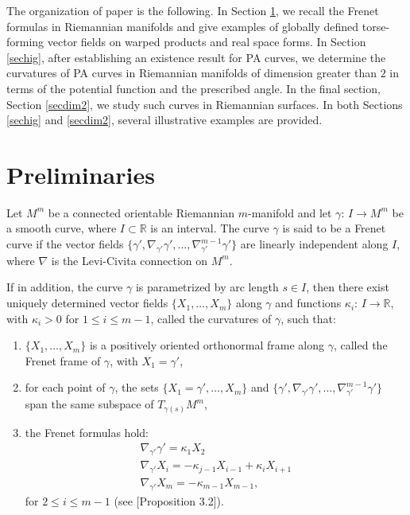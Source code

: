 \documentclass[12pt]{amsart}
\def\r{\mathbb R}
\theoremstyle{definition}
\begin{document}
The organization of paper is the following. In Section \ref{pre}, we recall the Frenet formulas in Riemannian manifolds and give examples of globally defined torse-forming vector fields on warped products and real space forms. In Section \ref{sechig}, after establishing an existence result for PA curves, we determine the curvatures of PA curves in Riemannian manifolds of dimension greater than $2$ in terms of the potential function and the prescribed angle. In the final section, Section \ref{secdim2}, we study such curves in Riemannian surfaces. In both Sections \ref{sechig} and \ref{secdim2}, several illustrative examples are provided.


\section{Preliminaries} \label{pre}

Let $M^m$ be a connected orientable Riemannian $m$-manifold and let $\gamma:\,I\to M^m$ be a smooth curve, where $I\subset \r$ is an interval.  The curve $\gamma$ is said to be a Frenet curve if the vector fields $\{\gamma',\nabla_{\gamma'}\gamma',...,\nabla_{\gamma'}^{m-1}\gamma'\}$ are linearly independent along $I$, where $\nabla$ is the Levi-Civita connection on $M^m$.

If in addition, the curve $\gamma$ is parametrized by arc length $s\in I$, then there exist uniquely determined vector fields $\{X_1,\ldots,X_m\}$ along $\gamma$ and functions $\kappa_i:\,I\to \r$, with $\kappa_i >0$ for $1\leq i \leq m-1$, called  the curvatures of $\gamma$, such that:
\begin{enumerate}
\item[(i)] $\{X_1,\ldots,X_m\}$ is a positively oriented orthonormal frame along $\gamma$, called the Frenet frame of $\gamma$, with $X_1=\gamma'$,

\item[(ii)] for each point of $\gamma$, the sets $\{X_1=\gamma',\ldots,X_m\}$ and $\{\gamma',\nabla_{\gamma'}\gamma',...,\nabla_{\gamma'}^{m-1}\gamma'\}$ 
span the same subspace of $T_{\gamma(s)}M^m$,

\item[(iii)]  the Frenet formulas hold:
\begin{equation*}
\left. 
\begin{array}{l}
\nabla_{\gamma'}\gamma'=\kappa_1 X_2 \\ 
\nabla_{\gamma'}X_i =-\kappa_{j-1} X_{i-1}+\kappa_{i} X_{i+1} \\
\nabla_{\gamma'}X_{m}=-\kappa_{m-1} X_{m-1},
\end{array}%
\right. 
\end{equation*}
for $2\leq i \leq m-1 $ (see [Proposition 3.2]\cite{lmm}).
\end{enumerate}
\end{document}
